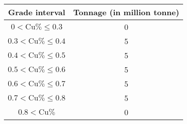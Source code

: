 \begin{center}
  \label{tab:q58-inv}
  \begin{tabular}{|c|c|}
    \hline
    \textbf{Grade interval} & \textbf{Tonnage (in million tonne)} \\ \hline
    $0 < \mathrm{Cu}\% \le 0.3$   & 0 \\ \hline
    $0.3 < \mathrm{Cu}\% \le 0.4$ & 5 \\ \hline
    $0.4 < \mathrm{Cu}\% \le 0.5$ & 5 \\ \hline
    $0.5 < \mathrm{Cu}\% \le 0.6$ & 5 \\ \hline
    $0.6 < \mathrm{Cu}\% \le 0.7$ & 5 \\ \hline
    $0.7 < \mathrm{Cu}\% \le 0.8$ & 5 \\ \hline
    $0.8 < \mathrm{Cu}\%$         & 0 \\ \hline
  \end{tabular}
\end{center}
